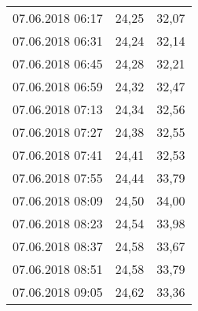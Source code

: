 \documentclass[a4paper,11pt,twoside]{article}
\begin{document}
\begin{longtable}[c]{ccc}
07.06.2018 06:17       & 24,25                & 32,07                          \\
07.06.2018 06:31       & 24,24                & 32,14                          \\
07.06.2018 06:45       & 24,28                & 32,21                          \\
07.06.2018 06:59       & 24,32                & 32,47                          \\
07.06.2018 07:13       & 24,34                & 32,56                          \\
07.06.2018 07:27       & 24,38                & 32,55                          \\
07.06.2018 07:41       & 24,41                & 32,53                          \\
07.06.2018 07:55       & 24,44                & 33,79                          \\
07.06.2018 08:09       & 24,50                & 34,00                          \\
07.06.2018 08:23       & 24,54                & 33,98                          \\
07.06.2018 08:37       & 24,58                & 33,67                          \\
07.06.2018 08:51       & 24,58                & 33,79                          \\
07.06.2018 09:05       & 24,62                & 33,36                         
\end{longtable}
\end{document}
